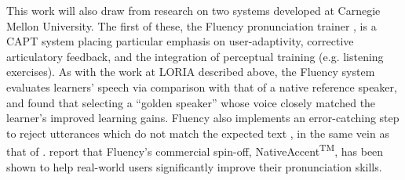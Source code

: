 	This work will also draw from research on two systems developed at Carnegie Mellon University.
%
	The first of these, the Fluency pronunciation trainer \citep{Eskenazi1998,Eskenazi2000}, is a CAPT system placing particular emphasis on
user-adaptivity, corrective articulatory feedback, and the integration of perceptual training (e.g. listening exercises). As with the work at LORIA described above, the Fluency system evaluates learners' speech via comparison with that of a native reference speaker, and \textcite{Probst2002} found that selecting a ``golden speaker'' whose voice closely matched the learner's improved learning gains. Fluency also implements an error-catching step to reject utterances which do not match the expected text \citep{Eskenazi2000}, in the same vein as that of \textcite{Mesbahi2011,Orosanu2012}. \textcite{Eskenazi2007} report that Fluency's commercial spin-off, NativeAccent\textsuperscript{TM}, has been shown to help real-world users significantly improve their pronunciation skills.
	
